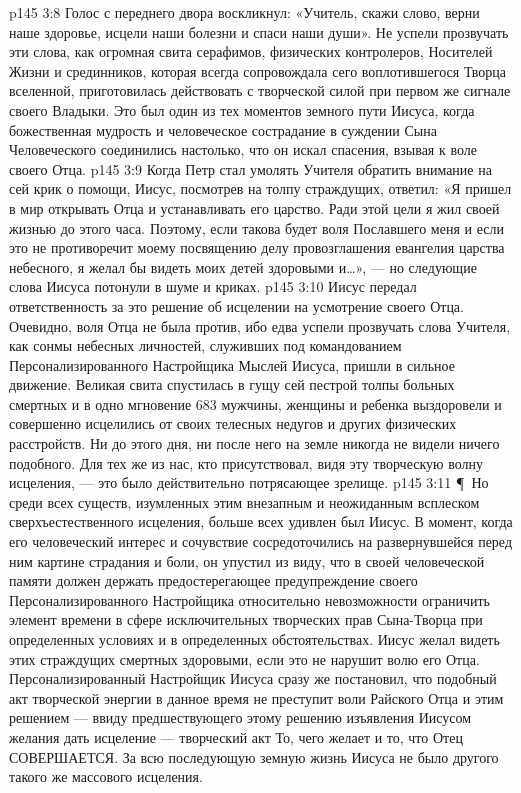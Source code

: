 \vs p145 3:8 Голос с переднего двора воскликнул: «Учитель, скажи слово, верни наше здоровье, исцели наши болезни и спаси наши души». Не успели прозвучать эти слова, как огромная свита серафимов, физических контролеров, Носителей Жизни и срединников, которая всегда сопровождала сего воплотившегося Творца вселенной, приготовилась действовать с творческой силой при первом же сигнале своего Владыки. Это был один из тех моментов земного пути Иисуса, когда божественная мудрость и человеческое сострадание в суждении Сына Человеческого соединились настолько, что он искал спасения, взывая к воле своего Отца.
\vs p145 3:9 Когда Петр стал умолять Учителя обратить внимание на сей крик о помощи, Иисус, посмотрев на толпу страждущих, ответил: «Я пришел в мир открывать Отца и устанавливать его царство. Ради этой цели я жил своей жизнью до этого часа. Поэтому, если такова будет воля Пославшего меня и если это не противоречит моему посвящению делу провозглашения евангелия царства небесного, я желал бы видеть моих детей здоровыми и\ldots », --- но следующие слова Иисуса потонули в шуме и криках.
\vs p145 3:10 Иисус передал ответственность за это решение об исцелении на усмотрение своего Отца. Очевидно, воля Отца не была против, ибо едва успели прозвучать слова Учителя, как сонмы небесных личностей, служивших под командованием Персонализированного Настройщика Мыслей Иисуса, пришли в сильное движение. Великая свита спустилась в гущу сей пестрой толпы больных смертных и в одно мгновение 683 мужчины, женщины и ребенка выздоровели и совершенно исцелились от своих телесных недугов и других физических расстройств. Ни до этого дня, ни после него на земле никогда не видели ничего подобного. Для тех же из нас, кто присутствовал, видя эту творческую волну исцеления, --- это было действительно потрясающее зрелище.
\vs p145 3:11 \P\ Но среди всех существ, изумленных этим внезапным и неожиданным всплеском сверхъестественного исцеления, больше всех удивлен был Иисус. В момент, когда его человеческий интерес и сочувствие сосредоточились на развернувшейся перед ним картине страдания и боли, он упустил из виду, что в своей человеческой памяти должен держать предостерегающее предупреждение своего Персонализированного Настройщика относительно невозможности ограничить элемент времени в сфере исключительных творческих прав Сына\hyp{}Творца при определенных условиях и в определенных обстоятельствах. Иисус желал видеть этих страждущих смертных здоровыми, если это не нарушит волю его Отца. Персонализированный Настройщик Иисуса сразу же постановил, что подобный акт творческой энергии в данное время не преступит воли Райского Отца и этим решением --- ввиду предшествующего этому решению изъявления Иисусом желания дать исцеление --- творческий акт  То, чего желает  и то, что Отец  СОВЕРШАЕТСЯ. За всю последующую земную жизнь Иисуса не было другого такого же массового исцеления.
